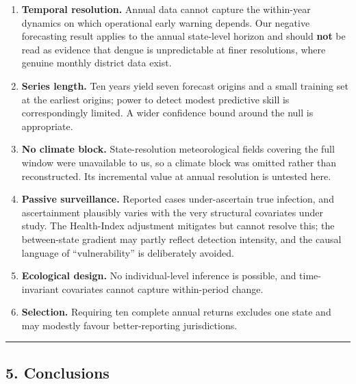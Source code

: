 \documentclass[
  10pt,
  twocolumn]{article}
\providecommand{\tightlist}{%
  \setlength{\itemsep}{0pt}\setlength{\parskip}{0pt}}
\begin{document}
\begin{enumerate}
\def\labelenumi{\arabic{enumi}.}
\tightlist
\item
  \textbf{Temporal resolution.} Annual data cannot capture the
  within-year dynamics on which operational early warning depends. Our
  negative forecasting result applies to the annual state-level horizon
  and should \textbf{not} be read as evidence that dengue is
  unpredictable at finer resolutions, where genuine monthly district
  data exist.
\item
  \textbf{Series length.} Ten years yield seven forecast origins and a
  small training set at the earliest origins; power to detect modest
  predictive skill is correspondingly limited. A wider confidence bound
  around the null is appropriate.
\item
  \textbf{No climate block.} State-resolution meteorological fields
  covering the full window were unavailable to us, so a climate block
  was omitted rather than reconstructed. Its incremental value at annual
  resolution is untested here.
\item
  \textbf{Passive surveillance.} Reported cases under-ascertain true
  infection, and ascertainment plausibly varies with the very structural
  covariates under study. The Health-Index adjustment mitigates but
  cannot resolve this; the between-state gradient may partly reflect
  detection intensity, and the causal language of ``vulnerability'' is
  deliberately avoided.
\item
  \textbf{Ecological design.} No individual-level inference is possible,
  and time-invariant covariates cannot capture within-period change.
\item
  \textbf{Selection.} Requiring ten complete annual returns excludes one
  state and may modestly favour better-reporting jurisdictions.
\end{enumerate}

\begin{center}\rule{0.5\linewidth}{0.5pt}\end{center}

\subsection{5. Conclusions}\label{conclusions}
\end{document}
